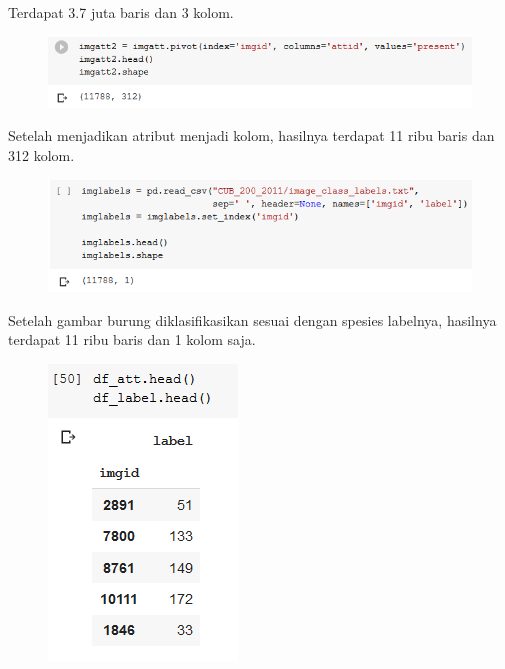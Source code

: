 \begin{enumerate}
	Terdapat 3.7 juta baris dan 3 kolom.

	\hfill\break
	\begin{figure}[H]
	\centering
		\includegraphics[width=8 cm]{figures/1174006/chapter3/soalpraktek/4-3.PNG}
	\end{figure}

	Setelah menjadikan atribut menjadi kolom, hasilnya terdapat 11 ribu baris dan 312 kolom.

	\hfill\break
	\begin{figure}[H]
	\centering
		\includegraphics[width=8 cm]{figures/1174006/chapter3/soalpraktek/4-4.PNG}
	\end{figure}

	Setelah gambar burung diklasifikasikan sesuai dengan spesies labelnya, hasilnya terdapat 11 ribu baris dan 1 kolom saja.

	\hfill\break
	\begin{figure}[H]
	\centering
		\includegraphics[width=8 cm]{figures/1174006/chapter3/soalpraktek/4-5.PNG}
	\end{figure}


\end{enumerate}
